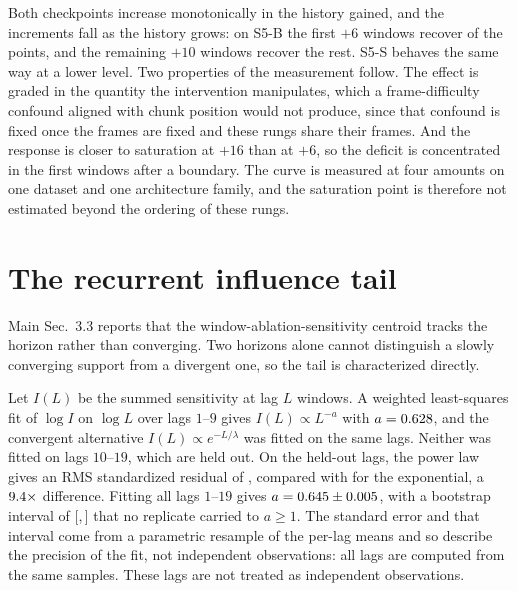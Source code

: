 \documentclass[10pt,twocolumn,letterpaper]{article}
\begin{document}
Both checkpoints increase monotonically in the history gained, and the increments fall as
the history grows: on S5-B the first $+6$ windows recover \ssmDoseBaseSix{} of the
\ssmPairedMapVelBase{} points, and the remaining $+10$ windows recover the rest. S5-S
behaves the same way at a lower level. Two properties of the measurement follow. The effect
is graded in the quantity the intervention manipulates, which a frame-difficulty confound
aligned with chunk position would not produce, since that confound is fixed once the frames
are fixed and these rungs share their frames. And the response is closer to saturation at
$+16$ than at $+6$, so the deficit is concentrated in the first windows after a boundary.
The curve is measured at four amounts on one dataset and one architecture family, and the
saturation point is therefore not estimated beyond the ordering of these rungs.

\section{The recurrent influence tail}

Main Sec.~3.3 reports that the window-ablation-sensitivity centroid tracks the horizon
rather than converging. Two horizons alone cannot distinguish a slowly converging support
from a divergent one, so the tail is characterized directly.

Let $I(L)$ be the summed sensitivity at lag $L$ windows. A weighted least-squares fit of
$\log I$ on $\log L$ over lags $1$--$9$ gives $I(L)\propto L^{-a}$ with $a=0.628$, and
the convergent alternative $I(L)\propto e^{-L/\lambda}$ was fitted on the same lags. Neither
was fitted on lags $10$--$19$, which are held out. On the held-out lags, the power law gives
an RMS standardized residual of
\tailRmsPower{}, compared with \tailRmsExp{} for the exponential, a $9.4\times$
difference. Fitting all lags $1$--$19$ gives $a=0.645\pm0.005$, with a
bootstrap interval of [\tailExpLo,\,\tailExpHi] that no replicate carried to $a\geq1$. The
standard error and that interval come from a parametric resample of the per-lag means and so
describe the precision of the fit, not independent observations: all lags are computed from
the same \histSamples{} samples. These lags are not treated as independent observations.
\end{document}
